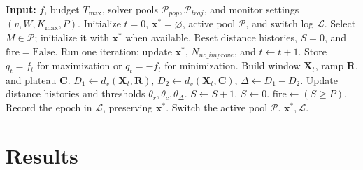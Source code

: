 \documentclass[review]{elsarticle}
\begin{document}
\begin{algorithm}[H]
   \caption{DTW/DDTW-guided metaheuristic switching}
   \label{alg:orchestrator_workflow}
   \begin{algorithmic}[1]
   \STATE \textbf{Input:} $f$, budget $T_{\max}$, solver pools
          $\mathcal{P}_{pop},\mathcal{P}_{traj}$, and monitor
          settings $(v,W,K_{\max},P)$.
   \STATE Initialize $t=0$, $\mathbf{x}^{*}=\varnothing$,
          active pool $\mathcal{P}$, and switch log $\mathcal{L}$.
       \STATE Select $M\in\mathcal{P}$; initialize it with
              $\mathbf{x}^{*}$ when available.
       \STATE Reset distance histories,
              $S=0$, and $\mathrm{fire}=\mathrm{False}$.
           \STATE Run one iteration; update $\mathbf{x}^{*}$,
                  $N_{no\_improve}$, and $t\gets t+1$.
           \STATE Store $q_t=f_t$ for maximization or
                  $q_t=-f_t$ for minimization.
               \STATE Build window $\mathbf{X}_t$, ramp $\mathbf{R}$,
                      and plateau $\mathbf{C}$.
               \STATE $D_1\gets d_v(\mathbf{X}_t,\mathbf{R})$,
                      $D_2\gets d_v(\mathbf{X}_t,\mathbf{C})$,
                      $\Delta\gets D_1-D_2$.
               \STATE Update distance histories and thresholds
                      $\theta_r,\theta_c,\theta_{\Delta}$.
                   \STATE $S\gets S+1$.
               \ELSE
                   \STATE $S\gets0$.
               \ENDIF
               \STATE $\mathrm{fire}\gets(S\geq P)$.
           \ENDIF
       \ENDWHILE
       \STATE Record the epoch in $\mathcal{L}$,
              preserving $\mathbf{x}^{*}$.
           \STATE Switch the active pool $\mathcal{P}$.
       \ENDIF
   \ENDWHILE
   \RETURN $\mathbf{x}^{*},\mathcal{L}$.
   \end{algorithmic}
   \end{algorithm}
\section{Results}
\label{sec:results_and_discussion}
\end{document}
